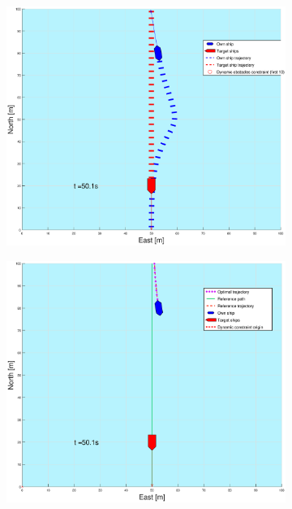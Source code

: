 \begin{figure}[ht]\ContinuedFloat
    \begin{subfigure}[b]{0.49\textwidth}
        \centering
        \includegraphics[width=\textwidth]{Images/Figures/enkel_HO/_Simple_1fig1_time=50}
    \end{subfigure}
    \hfill
    \begin{subfigure}[b]{0.499\textwidth}
        \centering
        \includegraphics[width=\textwidth]{Images/Figures/enkel_HO/_Simple_1fig999_time=50}

\end{subfigure}
\end{figure}
